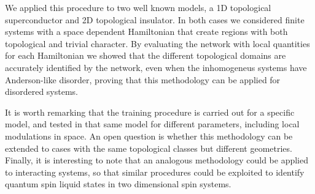 We applied this procedure to two well known models,  a  1D
topological superconductor and 2D topological insulator. In both
cases we considered finite systems with a space dependent Hamiltonian that
create regions with both topological and trivial character.
By evaluating the network with local quantities for each Hamiltonian we showed
that the different topological domains are accurately identified by the network,
even when the inhomogeneus systems have Anderson-like disorder, proving that
this methodology can be applied for disordered systems.

It is worth remarking that the training procedure is carried out for a specific
model, and tested in that same model for different parameters, including local
modulations in space.
An open question is whether this methodology can be extended to cases with the
same topological classes but different geometries.
Finally, it is interesting to note that an analogous methodology could be
applied  
to interacting systems, so that similar procedures could be exploited
to identify
quantum spin liquid states in two dimensional spin systems.
